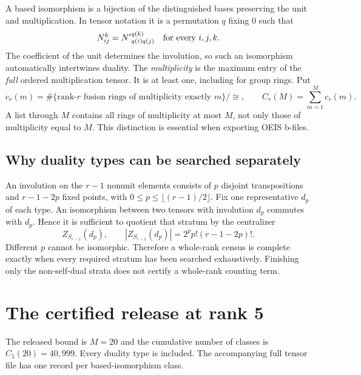 \documentclass[11pt,a4paper]{article}
\theoremstyle{definition}\newtheorem{definition}[theorem]{Definition}\newtheorem{remark}[theorem]{Remark}
\begin{document}
A based isomorphism is a bijection of the distinguished bases preserving the
unit and multiplication. In tensor notation it is a permutation $q$ fixing $0$
such that
\[
 N_{ij}^{k}={N'}_{q(i)q(j)}^{q(k)}\quad\hbox{for every }i,j,k.
\]
The coefficient of the unit determines the involution, so such an isomorphism
automatically intertwines duality. The \emph{multiplicity} is the maximum entry
of the \emph{full} ordered multiplication tensor. It is at least one, including
for group rings. Put
\[
 c_r(m)=\#\{\text{rank-}r\text{ fusion rings of multiplicity exactly }m\}/\cong,
 \qquad C_r(M)=\sum_{m=1}^{M}c_r(m).
\]
A list through $M$ contains all rings of multiplicity at most $M$, not only
those of multiplicity equal to $M$. This distinction is essential when exporting
OEIS b-files.

\subsection{Why duality types can be searched separately}
An involution on the $r-1$ nonunit elements consists of $p$ disjoint transpositions
and $r-1-2p$ fixed points, with $0\leq p\leq\lfloor(r-1)/2\rfloor$. Fix one
representative $d_p$ of each type. An isomorphism between two tensors with
involution $d_p$ commutes with $d_p$. Hence it is sufficient to quotient that
stratum by the centralizer
\[
 Z_{S_{r-1}}(d_p),\qquad |Z_{S_{r-1}}(d_p)|=2^p p!(r-1-2p)!.
\]
Different $p$ cannot be isomorphic. Therefore a whole-rank census is complete
exactly when every required stratum has been searched exhaustively. Finishing
only the non-self-dual strata does not certify a whole-rank counting term.
\section{The certified release at rank 5}
The released bound is $M=20$ and the cumulative number of classes is $C_{5}(20)=40,999$. Every duality type is included. The accompanying full tensor file has one record per based-isomorphism class.
\end{document}
